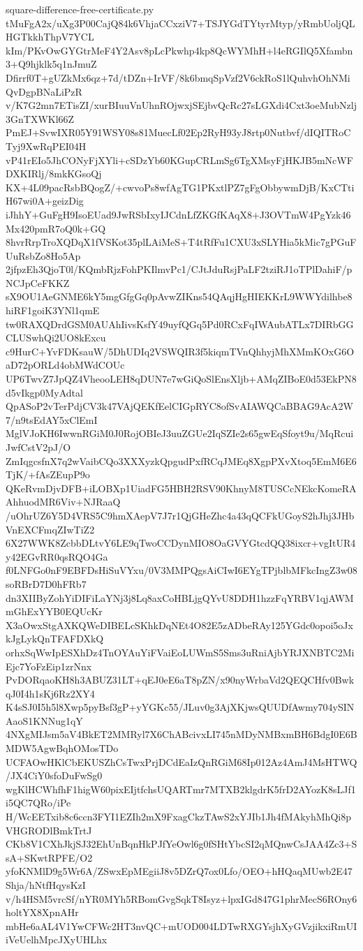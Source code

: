 \documentclass[11pt]{article}
\theoremstyle{definition}
\theoremstyle{remark}
\begin{document}
\begin{filecontents*}[overwrite]{square-difference-free-certificate.py}
tMuFgA2x/uXg3P00CajQ84k6VhjaCCxziV7+TSJYGdTYtyrMtyp/yRmbUoljQLHGTkkhThpV7YCL
kIm/PKvOwGYGtrMeF4Y2Asv8pLcPkwhp4kp8QcWYMhH+l4eRGIlQ5Xfambn3+Q9hjklk5q1nJmuZ
Dfirrf0T+gUZkMx6qz+7d/tDZn+IrVF/8k6bmqSpVzf2V6ckRoS1lQuhvhOhNMiQvDgpBNaLiPzR
v/K7G2mn7ETisZI/xurBIuuVnUhnROjwxjSEjbvQcRc27sLGXdi4Cxt3oeMubNzlj3GnTXWKl66Z
PmEJ+SvwIXR05Y91WSY08s81MuecLf02Ep2RyH93yJ8rtp0Nutbvf/dIQITRoCTyj9XwRqPEI04H
vP41rEIo5JhCONyFjXYli+cSDzYb60KGupCRLmSg6TgXMsyFjHKJB5mNcWFDXKIRlj/8mkKGsoQj
KX+4L09pacRsbBQogZ/+cwvoPs8wfAgTG1PKxtlPZ7gFgObbywmDjB/KxCTtiH67wi0A+geizDig
iJhhY+GuFgH9IsoEUad9JwRSbIxyIJCdnLfZKGfKAqX8+J3OVTmW4PgYzk46Mx420pmR7oQ0k+GQ
8hvrRrpTroXQDqX1fVSKot35plLAiMeS+T4tRfFu1CXU3xSLYHia5kMic7gPGuFUuRsbZo8Ho5Ap
2jfpzEh3QjoT0l/KQmbRjzFohPKIlmvPc1/CJtJduRsjPaLF2tziRJ1oTPlDahiF/pNCJpCeFKKZ
sX9OU1AeGNME6kY5mgGfgGq0pAvwZIKns54QAqjHgHIEKKrL9WWYdilhbe8hiRF1goiK3YNl1qmE
tw0RAXQDrdGSM0AUAhIivsKsfY49uyfQGq5Pd0RCxFqIWAubATLx7DIRbGGCLUSwhQi2UO8kExcu
c9HurC+YvFDKsauW/5DhUDIq2VSWQIR3f5kiqmTVnQhhyjMhXMmKOxG6OaD72pORLd4obMWdCOUc
UP6TwvZ7JpQZ4VheooLEH8qDUN7e7wGiQoSlEnsXljb+AMqZIBoE0d53EkPN8d5vIkgp0MyAdtal
QpASoP2vTerPdjCV3k47VAjQEKfEelCIGpRYC8ofSvAIAWQCaBBAG9AcA2W7/n9tsEdAY5xClEmI
MglVJoKH6IwwnRGiM0J0RojOBIeJ3uuZGUe2IqSZIe2s65gwEqSfoyt9u/MqRcuiJwfCstV2pJ/O
ZmIqgcsfnX7q2wVaibCQo3XXXyzkQpgudPxfRCqJMEq8XgpPXvXtoq5EmM6E6TjK/+fAsZEupP9o
QKeRvmDjvDFB+iLOBXp1UiadFG5HBH2RSV90KhnyM8TUSCcNEkcKomeRAAhhuodMR6Viv+NJRaaQ
/uOhrUZ6Y5D4VRS5C9hmXAepV7J7r1QjGHeZhc4a43qQCFkUGoyS2hJhj3JHbVnEXCFmqZIwTiZ2
6X27WWK8ZcbbDLtvY6LE9qTwoCCDynMIO8OaGVYGtcdQQ38ixcr+vgItUR4y42EGvRR0qsRQO4Ga
f0LNFGo0nF9EBFDsHiSuVYxu/0V3MMPQgsAiCIwI6EYgTPjblbMFkcIngZ3w08soRBrD7D0hFRb7
dn3XIIByZohYiDIFiLaYNj3j8Lq8axCoHBLjgQYvU8DDH1hzzFqYRBV1qjAWMmGhExYYB0EQUcKr
X3aOwxStgAXKQWeDIBELcSKhkDqNEt4O82E5zADbeRAy125YGdc0opoi5oJxkJgLykQnTFAFDXkQ
orhxSqWwIpESXhDz4TnOYAuYiFVaiEoLUWmS5Sms3uRniAjbYRJXNBTC2MiEjc7YoFzEip1zrNnx
PvDORqaoKH8h3ABUZ31LT+qEJ0eE6aT8pZN/x90nyWrbaVd2QEQCHfv0BwkqJ0I4h1sKj6Rz2XY4
K4sSJ0I5h5l8Xwp5pyBsf3gP+yYGKc55/JLuv0g3AjXKjwsQUUDfAwmy704ySINAaoS1KNNug1qY
4NXgMIJsm5aV4BkET2MMRyl7X6ChABcivxLI745nMDyNMBxmBH6BdgI0E6BMDW5AgwBqhOMosTDo
UCFAOwHKlCbEKUSZhCsTwxPrjDCdEaIzQnRGiM68Ip012Az4AmJ4MsHTWQ/JX4CiY0sfoDuFwSg0
wgKlHCWhfhF1higW60pixEIjtfchsUQARTmr7MTXB2klgdrK5frD2AYozK8sLJf1i5QC7QRo/iPe
H/WcEETxib8c6ccn3FYI1EZIh2mX9FxagCkzTAwS2xYJIb1Jh4fMAkyhMhQi8pVHGRODlBmkTrtJ
CKb8V1CXhJkjSJ32EhUnBqnHkPJfYeOwl6g0fSHtYbcSI2qMQnwCsJAA4Zc3+SsA+SKwtRPFE/O2
yfoKNMlD9g5Wr6A/ZSwxEpMEgiiJ8v5DZrQ7ox0Lfo/OEO+hHQaqMUwb2E47Shja/hNtfHqysKzI
v/h4HSM5vrcSf/nYR0MYh5RBomGvgSqkT8Isyz+lpxIGd847G1phrMecS6ROny6holtYX8XpnAHr
mbHe6aAL4V1YwCFWc2HT3nvQC+mUOD004LDTwRXGYsjhXyGVzjikxiRmUIiVeUelhMpcJXyUHLhx

\end{filecontents*}
\end{document}
